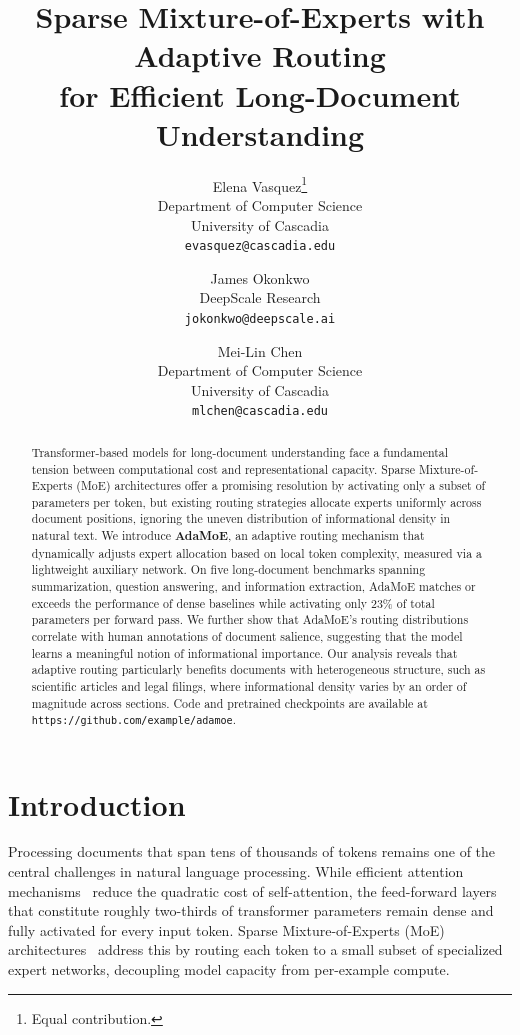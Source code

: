 \documentclass[11pt,a4paper]{article}
\title{Sparse Mixture-of-Experts with Adaptive Routing\\for Efficient Long-Document Understanding}
\author{
  Elena Vasquez\thanks{Equal contribution.} \\
  Department of Computer Science\\
  University of Cascadia\\
  \texttt{evasquez@cascadia.edu}
  \and
  James Okonkwo\footnotemark[1] \\
  DeepScale Research\\
  \texttt{jokonkwo@deepscale.ai}
  \and
  Mei-Lin Chen \\
  Department of Computer Science\\
  University of Cascadia\\
  \texttt{mlchen@cascadia.edu}
}
\date{}
\begin{document}
\maketitle

\begin{abstract}
Transformer-based models for long-document understanding face a fundamental tension between
computational cost and representational capacity.
Sparse Mixture-of-Experts (MoE) architectures offer a promising resolution by activating only a
subset of parameters per token, but existing routing strategies allocate experts uniformly across
document positions, ignoring the uneven distribution of informational density in natural text.
We introduce \textbf{AdaMoE}, an adaptive routing mechanism that dynamically adjusts expert
allocation based on local token complexity, measured via a lightweight auxiliary network.
On five long-document benchmarks spanning summarization, question answering, and information
extraction, AdaMoE matches or exceeds the performance of dense baselines while activating only
23\% of total parameters per forward pass.
We further show that AdaMoE's routing distributions correlate with human annotations of
document salience, suggesting that the model learns a meaningful notion of informational
importance.
Our analysis reveals that adaptive routing particularly benefits documents with heterogeneous
structure, such as scientific articles and legal filings, where informational density varies
by an order of magnitude across sections.
Code and pretrained checkpoints are available at \texttt{https://github.com/example/adamoe}.
\end{abstract}

\section{Introduction}
\label{sec:intro}

Processing documents that span tens of thousands of tokens remains one of the central challenges
in natural language processing.
While efficient attention mechanisms~\cite{child2019sparsetransformer,beltagy2020longformer,
zaheer2020bigbird} reduce the quadratic cost of self-attention, the feed-forward layers that
constitute roughly two-thirds of transformer parameters remain dense and fully activated for
every input token.
Sparse Mixture-of-Experts (MoE) architectures~\cite{shazeer2017outrageously,lepikhin2021gshard,
fedus2022switch} address this by routing each token to a small subset of specialized expert
networks, decoupling model capacity from per-example compute.
\end{document}
